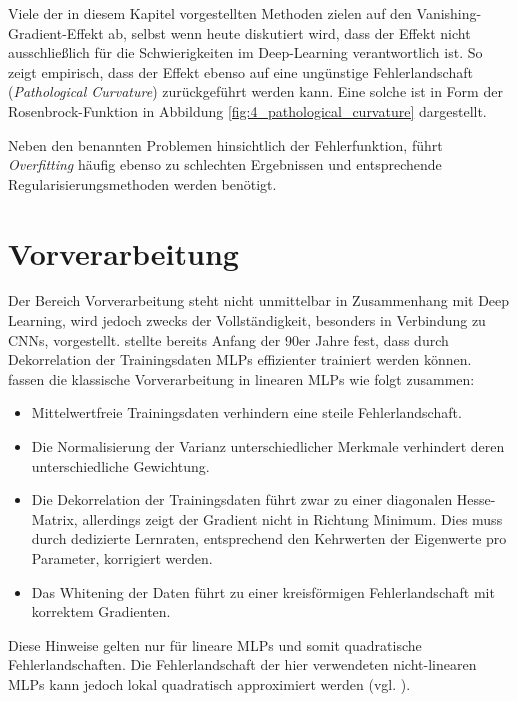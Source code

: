 Viele der in diesem Kapitel vorgestellten Methoden zielen auf den Vanishing-Gradient-Effekt ab, selbst wenn heute diskutiert wird, dass der Effekt nicht ausschließlich für die Schwierigkeiten im Deep-Learning verantwortlich ist. So zeigt \cite{Martens2010} empirisch, dass der Effekt ebenso auf eine ungünstige Fehlerlandschaft (\textit{Pathological Curvature}) zurückgeführt werden kann. Eine solche ist in Form der Rosenbrock-Funktion in Abbildung \ref{fig:4_pathological_curvature} dargestellt. 

Neben den benannten Problemen hinsichtlich der Fehlerfunktion, führt \textit{Overfitting} häufig ebenso zu schlechten Ergebnissen und entsprechende Regularisierungsmethoden werden benötigt.

\section{Vorverarbeitung}
Der Bereich Vorverarbeitung steht nicht unmittelbar in Zusammenhang mit Deep Learning, wird jedoch zwecks der Vollständigkeit, besonders in Verbindung zu CNNs, vorgestellt.
\cite{Becker1991} stellte bereits Anfang der 90er Jahre fest, dass durch Dekorrelation der Trainingsdaten MLPs effizienter trainiert werden können. 
\cite{LeCun1998b} fassen die klassische Vorverarbeitung in linearen MLPs wie folgt zusammen:
\begin{itemize}
\item Mittelwertfreie Trainingsdaten verhindern eine steile Fehlerlandschaft. 
\item Die Normalisierung der Varianz unterschiedlicher Merkmale verhindert deren unterschiedliche Gewichtung.
\item Die Dekorrelation der Trainingsdaten führt zwar zu einer diagonalen Hesse-Matrix, allerdings zeigt der Gradient nicht in Richtung Minimum. Dies muss durch dedizierte Lernraten, entsprechend den Kehrwerten der Eigenwerte pro Parameter, korrigiert werden.
\item Das Whitening der Daten führt zu einer kreisförmigen Fehlerlandschaft mit korrektem Gradienten.
\end{itemize}
Diese Hinweise gelten nur für lineare MLPs und somit quadratische Fehlerlandschaften. Die Fehlerlandschaft der hier verwendeten nicht-linearen MLPs kann jedoch lokal quadratisch approximiert werden (vgl. \cite{Hinton2015}).

